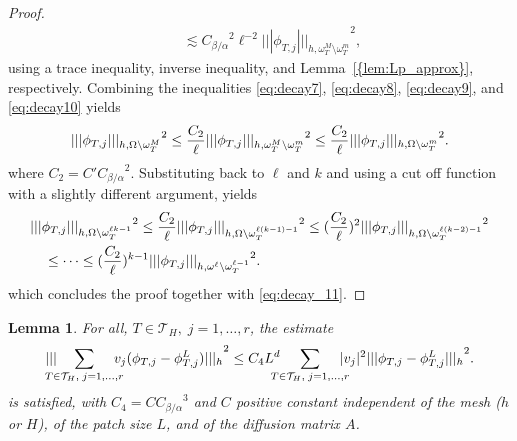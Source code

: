\documentclass[10pt]{article}
\numberwithin{equation}{section}
\theoremstyle{plain}
\newtheorem{lemma}[theorem]{Lemma}
\theoremstyle{definition}
\theoremstyle{remark}
\begin{document}
\begin{proof}
\begin{equation}
\begin{aligned}
  &\quad\lesssim {C_{{\beta}/{\alpha}}}^2\ell^{-2}{||| {\phi_{T,j}} |||_{h,{\omega^{M}_T\setminus\omega^{m}_T}}}^2 ,
  \end{aligned}
\end{equation}
using a trace inequality, inverse inequality, and {Lemma~\ref{{lem:Lp_approx}}}, respectively. Combining the inequalities \eqref{eq:decay7}, \eqref{eq:decay8}, \eqref{eq:decay9}, and \eqref{eq:decay10} yields
\begin{equation}\notag
  {||| {\phi_{T,j}} |||_{h,{\Omega\setminus\omega^{M}_T}}}^2 \leq \frac{ C_2}{\ell}{||| {\phi_{T,j}} |||_{h,{\omega^{M}_T\setminus\omega^{m}_T}}}^2 \leq \frac{ C_2}{\ell} {||| {\phi_{T,j}} |||_{h,{\Omega\setminus\omega^{m}_T}}}^2.
  \end{equation}
where $ C_2 = C'{C_{{\beta}/{\alpha}}}^2$. Substituting back to $\ell$ and $k$ and using a cut off function with a slightly different argument, yields
  \begin{equation}\notag
    \begin{aligned}
    &{||| {\phi_{T,j}} |||_{h,{\Omega\setminus\omega^{\ell k -1}_T}}}^2 \leq  \frac{ C_2}{\ell}{||| {\phi_{T,j}} |||_{h,{\Omega\setminus\omega^{\ell (k-1)-1}_T}}}^2 \leq (\frac{ C_2}{\ell})^2{||| {\phi_{T,j}} |||_{h,{\Omega\setminus\omega^{\ell (k-2)-1}_T}}}^2 \\
    &\quad\leq \dots \leq (\frac{ C_2}{\ell})^{k-1}{||| {\phi_{T,j}} |||_{h,{\omega^{\ell}\setminus\omega^{\ell-1}_T}}}^2.
    \end{aligned}
  \end{equation}
which concludes the proof together with \eqref{eq:decay_11}.
\end{proof}
\begin{lemma}\label{lem:discrete_finescale_decay}
  For all, $T\in{\mathcal{T}}_H,\;j=1,\ldots,r$, the estimate
  \begin{equation}\notag
    {||| {\hspace{-2ex}\sum_{T\in{\mathcal{T}}_H,\;j=1,\ldots,r}\hspace{-2ex}v_j(\phi_{T,j}-\phi^L_{T,j})} |||_h}^2 \leq  C_4L^d\hspace{-2ex}\sum_{T\in{\mathcal{T}}_H,\;j=1,\ldots,r}\hspace{-2ex}|v_j|^2{||| {\phi_{T,j}-\phi^L_{T,j}} |||_h}^2.
  \end{equation}
  is satisfied, with $C_4 = C{C_{{\beta}/{\alpha}}}^3$ and $C$ positive constant independent of the mesh ($h$ or $H$), of the patch size $L$, and of the diffusion matrix ${A}$.
\end{lemma}
\end{document}
